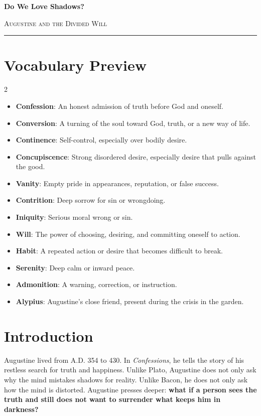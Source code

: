 \documentclass[12pt]{article}
\begin{document}
\begin{center}
{\LARGE\bfseries Do We Love Shadows?}\par\vspace{0.25em}
{\large\scshape Augustine and the Divided Will}\par\vspace{0.45em}
\rule{0.82\textwidth}{0.4pt}\par\vspace{0.7em}
\end{center}

\section*{Vocabulary Preview}
\begin{multicols}{2}
\begin{itemize}[leftmargin=*, itemsep=0.18em]
\item \textbf{Confession}: An honest admission of truth before God and oneself.
\item \textbf{Conversion}: A turning of the soul toward God, truth, or a new way of life.
\item \textbf{Continence}: Self-control, especially over bodily desire.
\item \textbf{Concupiscence}: Strong disordered desire, especially desire that pulls against the good.
\item \textbf{Vanity}: Empty pride in appearances, reputation, or false success.
\item \textbf{Contrition}: Deep sorrow for sin or wrongdoing.
\item \textbf{Iniquity}: Serious moral wrong or sin.
\item \textbf{Will}: The power of choosing, desiring, and committing oneself to action.
\item \textbf{Habit}: A repeated action or desire that becomes difficult to break.
\item \textbf{Serenity}: Deep calm or inward peace.
\item \textbf{Admonition}: A warning, correction, or instruction.
\item \textbf{Alypius}: Augustine's close friend, present during the crisis in the garden.
\end{itemize}
\end{multicols}

\section*{Introduction}
Augustine lived from A.D. 354 to 430. In \textit{Confessions}, he tells the story of his restless search for truth and happiness. Unlike Plato, Augustine does not only ask why the mind mistakes shadows for reality. Unlike Bacon, he does not only ask how the mind is distorted. Augustine presses deeper: \textbf{what if a person sees the truth and still does not want to surrender what keeps him in darkness?}
\end{document}
